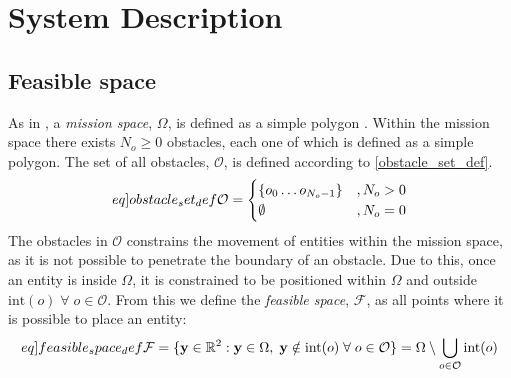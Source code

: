 \section{System Description}

\subsection{Feasible space}
As in \cite{sun2014escaping}, a \textit{mission space}, $\Omega$, is defined as a simple polygon 
\cite{weissteinsimplepolygon}.
Within the mission space there exists $N_{o}\geq 0$ obstacles, each one of which is defined as a simple polygon.
The set of all obstacles, $\mathcal{O}$, is defined according to \eqref{obstacle_set_def}.
\begin{equation}\label[eq]{obstacle_set_def}
  \mathcal{O} = \begin{cases}
    \{o_{0}\hdots o_{N_{o}-1}\} &, N_{o} > 0\\
    \emptyset &, N_{o} = 0\\
  \end{cases}
\end{equation}
The obstacles in $\mathcal{O}$ constrains the movement of entities within the mission space, as it is not possible to
penetrate the boundary of an obstacle. Due to this, once an entity is inside $\Omega$, it is constrained to be positioned within
$\Omega$ and outside $\mathrm{int}(o)\;\forall\;o\in\mathcal{O}$. From this we define the \textit{feasible space}, $\mathcal{F}$, as
all points where it is possible to place an entity:
\begin{equation}\label[eq]{feasible_space_def}
  \mathcal{F} = \{\mathbf{y}\in\mathbb{R}^{2}: \mathbf{y}\in\Omega,\;\mathbf{y}\notin\mathrm{int}(o)\;\forall\;o\in\mathcal{O}\} = \Omega\setminus\bigcup_{o\in\mathcal{O}}\mathrm{int}(o)
\end{equation}

